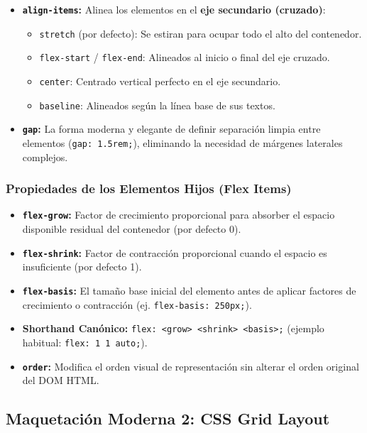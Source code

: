 \begin{itemize}[leftmargin=1.2cm]
\begin{itemize}
    \end{itemize}
  \item \textbf{\texttt{align-items}:} Alinea los elementos en el \textbf{eje secundario (cruzado)}:
    \begin{itemize}
      \item \texttt{stretch} (por defecto): Se estiran para ocupar todo el alto del contenedor.
      \item \texttt{flex-start} / \texttt{flex-end}: Alineados al inicio o final del eje cruzado.
      \item \texttt{center}: Centrado vertical perfecto en el eje secundario.
      \item \texttt{baseline}: Alineados según la línea base de sus textos.
    \end{itemize}
  \item \textbf{\texttt{gap}:} La forma moderna y elegante de definir separación limpia entre elementos (\texttt{gap: 1.5rem;}), eliminando la necesidad de márgenes laterales complejos.
\end{itemize}

\subsubsection{Propiedades de los Elementos Hijos (Flex Items)}
\begin{itemize}[leftmargin=1.2cm]
  \item \textbf{\texttt{flex-grow}:} Factor de crecimiento proporcional para absorber el espacio disponible residual del contenedor (por defecto 0).
  \item \textbf{\texttt{flex-shrink}:} Factor de contracción proporcional cuando el espacio es insuficiente (por defecto 1).
  \item \textbf{\texttt{flex-basis}:} El tamaño base inicial del elemento antes de aplicar factores de crecimiento o contracción (ej. \texttt{flex-basis: 250px;}).
  \item \textbf{Shorthand Canónico:} \texttt{flex: <grow> <shrink> <basis>;} (ejemplo habitual: \texttt{flex: 1 1 auto;}).
  \item \textbf{\texttt{order}:} Modifica el orden visual de representación sin alterar el orden original del DOM HTML.
\end{itemize}

\subsection{Maquetación Moderna 2: CSS Grid Layout}

